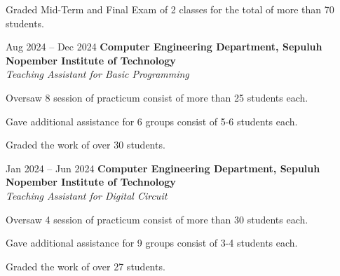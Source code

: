     \vspace{0.10 cm}
    \begin{onecolentry}
        \begin{highlights}
            \item Graded Mid-Term and Final Exam of 2 classes for the total of more than 70 students.
            \end{highlights}
    \end{onecolentry}

    \vspace{0.2 cm}

    \begin{twocolentry}{
        Aug 2024 – Dec 2024
    }
    \textbf{Computer Engineering Department, Sepuluh Nopember Institute of Technology}\\
    \textit{Teaching Assistant for Basic Programming}
    \end{twocolentry}

    \vspace{0.10 cm}
    \begin{onecolentry}
        \begin{highlights}
            \item Oversaw 8 session of practicum consist of more than 25 students each.
            \item Gave additional assistance for 6 groups consist of 5-6 students each.
            \item Graded the work of over 30 students.
        \end{highlights}
    \end{onecolentry}

    \vspace{0.2 cm}

    \begin{twocolentry}{
        Jan 2024 – Jun 2024
    }
    \textbf{Computer Engineering Department, Sepuluh Nopember Institute of Technology}\\
    \textit{Teaching Assistant for Digital Circuit}
    \end{twocolentry}

    \vspace{0.10 cm}
    \begin{onecolentry}
        \begin{highlights}
            \item Oversaw 4 session of practicum consist of more than 30 students each.
            \item Gave additional assistance for 9 groups consist of 3-4 students each.
            \item Graded the work of over 27 students.
        \end{highlights}
    \end{onecolentry}

